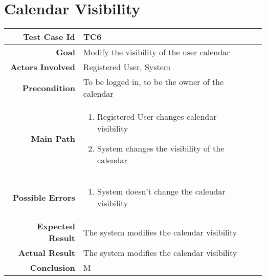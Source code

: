 \section{Calendar Visibility}
\begin{tabularx}{\linewidth}{|r|X|X|}
\hline   {\bf Test Case Id} &  TC6\\
  \hline  {\bf Goal} & Modify the visibility of the user calendar\\
  \hline  {\bf Actors Involved} & Registered User, System\\
  \hline  {\bf Precondition} & To be logged in, to be the owner of the calendar\\ 
   \hline  {\bf Main Path} & \begin{enumerate} 
   \item Registered User changes calendar visibility
    \item System changes the visibility of the calendar
   \end{enumerate}\\
   \hline  {\bf Possible Errors} & \begin{enumerate} 
   \item System doesn't change the calendar visibility
   \end{enumerate}\\
  \hline  {\bf Expected Result} & The system modifies the calendar visibility\\
  \hline  {\bf Actual Result} & The system modifies the calendar visibility\\
  \hline  {\bf Conclusion} & M\\
  \hline
  
\end{tabularx}



